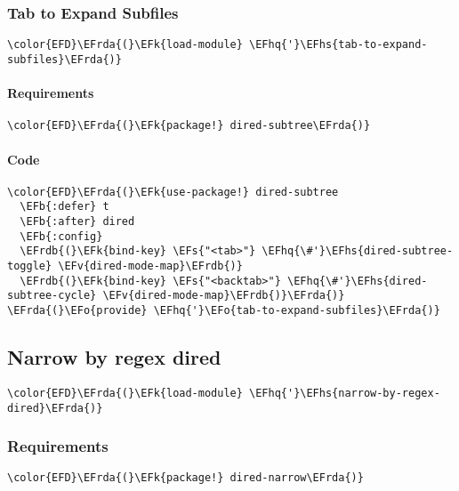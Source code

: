 \documentclass[a4wide,10pt]{article}
\newcommand{\EFs}[1]{\textcolor{EFs}{#1}} %
\newcommand{\EFk}[1]{\textcolor{EFk}{#1}} %
\newcommand{\EFb}[1]{\textcolor{EFb}{#1}} %
\newcommand{\EFv}[1]{\textcolor{EFv}{#1}} %
\newcommand{\EFo}[1]{\textcolor{EFo}{#1}} %
\newcommand{\EFhq}[1]{\textcolor{EFhq}{#1}} %
\newcommand{\EFhs}[1]{\textcolor{EFhs}{#1}} %
\newcommand{\EFrda}[1]{\textcolor{EFrda}{#1}} %
\newcommand{\EFrdb}[1]{\textcolor{EFrdb}{#1}} %
\begin{document}
\subsubsection{Tab to Expand Subfiles}
\label{sec:org5cc5854}
\begin{Code}
\begin{Verbatim}
\color{EFD}\EFrda{(}\EFk{load-module} \EFhq{'}\EFhs{tab-to-expand-subfiles}\EFrda{)}
\end{Verbatim}
\end{Code}
\paragraph{Requirements}
\label{sec:org5d56a6a}
\begin{Code}
\begin{Verbatim}
\color{EFD}\EFrda{(}\EFk{package!} dired-subtree\EFrda{)}
\end{Verbatim}
\end{Code}
\paragraph{Code}
\label{sec:orge1a04b9}
\begin{Code}
\begin{Verbatim}
\color{EFD}\EFrda{(}\EFk{use-package!} dired-subtree
  \EFb{:defer} t
  \EFb{:after} dired
  \EFb{:config}
  \EFrdb{(}\EFk{bind-key} \EFs{"<tab>"} \EFhq{\#'}\EFhs{dired-subtree-toggle} \EFv{dired-mode-map}\EFrdb{)}
  \EFrdb{(}\EFk{bind-key} \EFs{"<backtab>"} \EFhq{\#'}\EFhs{dired-subtree-cycle} \EFv{dired-mode-map}\EFrdb{)}\EFrda{)}
\EFrda{(}\EFo{provide} \EFhq{'}\EFo{tab-to-expand-subfiles}\EFrda{)}
\end{Verbatim}
\end{Code}
\subsection{Narrow by regex dired}
\label{sec:org0af1531}
\begin{Code}
\begin{Verbatim}
\color{EFD}\EFrda{(}\EFk{load-module} \EFhq{'}\EFhs{narrow-by-regex-dired}\EFrda{)}
\end{Verbatim}
\end{Code}
\subsubsection{Requirements}
\label{sec:org4e4ed08}
\begin{Code}
\begin{Verbatim}
\color{EFD}\EFrda{(}\EFk{package!} dired-narrow\EFrda{)}
\end{Verbatim}
\end{Code}
\end{document}
